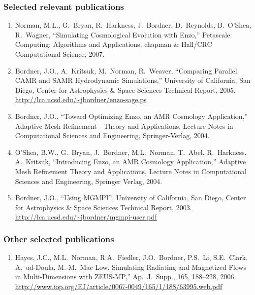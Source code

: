 \documentclass[11pt,letterpaper]{article}
\begin{document}
\subsubsection{Selected relevant publications}
\begin{enumerate}
\item Norman, M.L., G.~Bryan, R.~Harkness, J.~Bordner, D.~Reynolds, B.~O'Shea, R.~Wagner, 
      ``Simulating Cosmological Evolution with Enzo,''
      Petascale Computing: Algorithms and Applications,
      chapman \& Hall/CRC Computational Science,
      2007.
\item Bordner, J.O., A.~Kritsuk, M.~Norman, R.~Weaver, ``Comparing Parallel CAMR and SAMR Hydrodynamic Simulations,''
      University of California, San Diego, Center for Astrophysics \& Space Sciences Technical Report, 
      2005.  \url{http://lca.ucsd.edu/~jbordner/enzo-sage.ps}
\item Bordner, J.O., 
      ``Toward Optimizing Enzo, an AMR Cosmology Application,'' 
      Adaptive Mesh Refinement---Theory and Applications, 
      Lecture Notes in Computational Sciences and Engineering, 
      Springer-Verlag, 
      2004.
\item O'Shea, B.W., G.~Bryan, J.~Bordner, M.L.~Norman, T.~Abel, R.~Harkness, A.~Kritsuk, 
      ``Introducing Enzo, an AMR Cosmology Application,'' 
      Adaptive Mesh Refinement Theory and Applications, 
      Lecture Notes in Computational Sciences and Engineering, 
      Springer Verlag, 
      2004.
\item Bordner, J.O., ``Using MGMPI'',
      University of California, San Diego, Center for Astrophysics \& Space Sciences Technical Report, 
      2003.  \url{http://lca.ucsd.edu/~jbordner/mgmpi-user.pdf}
\end{enumerate}

\subsubsection{Other selected publications}

\begin{enumerate}
\item Hayes, J.C., M.L.~Norman, R.A.~Fiedler, J.O.~Bordner, P.S.~Li, S.E.~Clark, A.~ud-Doula, M.-M.~Mac Low, Simulating Radiating and Magnetized Flows in Multi-Dimensions with ZEUS-MP,'' Ap.~J.~Supp., 165, 188--228, 2006.  \url{http://www.iop.org/EJ/article/0067-0049/165/1/188/63995.web.pdf}
\end{enumerate}
\end{document}
